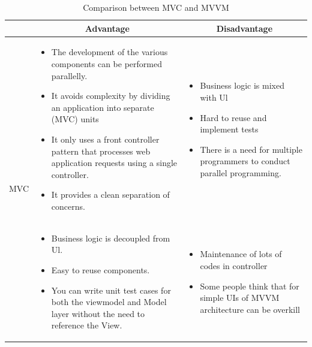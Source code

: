 \begin{table}[H]
    \centering
    \begin{tabular}{| c | p{} | p{} |}
        \hline
        \multicolumn{1}{|c|}{}
        & \multicolumn{1}{c|}{Advantage}
        & \multicolumn{1}{c|}{Disadvantage} \\ \hline
        \multirow{7}{*}{MVC}     
                &   \begin{itemize}[leftmargin=*,topsep=0pt,partopsep=0pt,parsep=0pt]
                        \item The development of the various components can be performed parallelly.
                        \item It avoids complexity by dividing an application into separate (MVC) units
                        \item It only uses a front controller pattern that processes web application requests using a single controller.
                        \item It provides a clean separation of concerns.
                    \end{itemize}
                &   \begin{itemize}[leftmargin=*,topsep=0pt,partopsep=0pt,parsep=0pt]
                        \item Business logic is mixed with Ul
                        \item Hard to reuse and implement tests
                        \item There is a need for multiple programmers to conduct parallel programming.
                    \end{itemize} \\ \hline
        \multirow{5}{*}{MVVC}
                &   \begin{itemize}[leftmargin=*,topsep=0pt,partopsep=0pt,parsep=0pt]
                        \item Business logic is decoupled from Ul.
                        \item Easy to reuse components.
                        \item You can write unit test cases for both the viewmodel and Model layer without the need to reference the View.
                    \end{itemize}
                &   \begin{itemize}[leftmargin=*,topsep=0pt,partopsep=0pt,parsep=0pt]
                        \item Maintenance of lots of codes in controller
                        \item Some people think that for simple UIs of MVVM architecture can be overkill
                    \end{itemize} \\ \hline
    \end{tabular}
    \caption{Comparison between MVC and MVVM}
\end{table}

